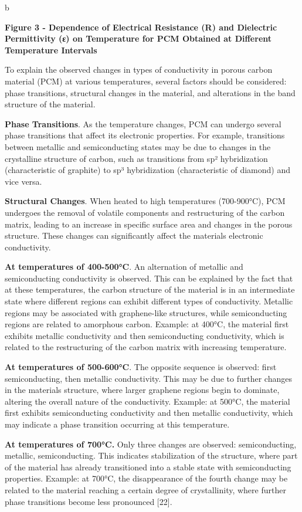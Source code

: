 b

\textbf{Figure 3 - Dependence of Electrical Resistance (R) and
Dielectric Permittivity (ε) on Temperature for PCM Obtained at Different
Temperature Intervals}

To explain the observed changes in types of conductivity in porous
carbon material (PCM) at various temperatures, several factors should be
considered: phase transitions, structural changes in the material, and
alterations in the band structure of the material.

\textbf{Phase Transitions}. As the temperature changes, PCM can undergo
several phase transitions that affect its electronic properties. For
example, transitions between metallic and semiconducting states may be
due to changes in the crystalline structure of carbon, such as
transitions from sp² hybridization (characteristic of graphite) to sp³
hybridization (characteristic of diamond) and vice versa.

\textbf{Structural Changes}. When heated to high temperatures
(700-900°C), PCM undergoes the removal of volatile components and
restructuring of the carbon matrix, leading to an increase in specific
surface area and changes in the porous structure. These changes can
significantly affect the material\textquotesingle s electronic
conductivity.

\textbf{At temperatures of 400-500°C}. An alternation of metallic and
semiconducting conductivity is observed. This can be explained by the
fact that at these temperatures, the carbon structure of the material is
in an intermediate state where different regions can exhibit different
types of conductivity. Metallic regions may be associated with
graphene-like structures, while semiconducting regions are related to
amorphous carbon. Example: at 400°C, the material first exhibits
metallic conductivity and then semiconducting conductivity, which is
related to the restructuring of the carbon matrix with increasing
temperature.

\textbf{At temperatures of 500-600°C}. The opposite sequence is
observed: first semiconducting, then metallic conductivity. This may be
due to further changes in the material\textquotesingle s structure,
where larger graphene regions begin to dominate, altering the overall
nature of the conductivity. Example: at 500°C, the material first
exhibits semiconducting conductivity and then metallic conductivity,
which may indicate a phase transition occurring at this temperature.

\textbf{At temperatures of 700°C.} Only three changes are observed:
semiconducting, metallic, semiconducting. This indicates stabilization
of the structure, where part of the material has already transitioned
into a stable state with semiconducting properties. Example: at 700°C,
the disappearance of the fourth change may be related to the material
reaching a certain degree of crystallinity, where further phase
transitions become less pronounced {[}22{]}.


